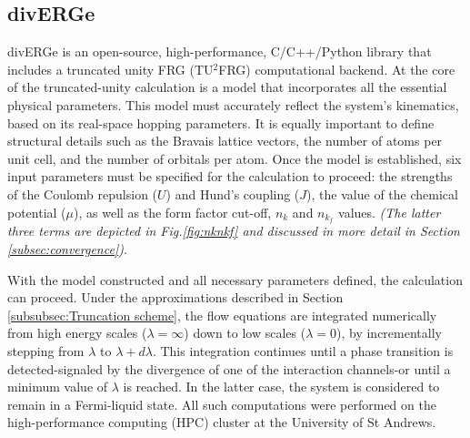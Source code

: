 \documentclass[12pt]{article}
\begin{document}
\subsection{divERGe}
\label{subsec:diverge}




\noindent divERGe is an open-source, high-performance, C/C++/Python library that includes a truncated unity FRG (TU$^2$FRG) computational backend\cite{profe2024diverge}. 
At the core of the truncated-unity calculation is a model that incorporates all the essential physical parameters. This model must accurately reflect the system's kinematics, based on its real-space hopping parameters.
It is equally important to define structural details such as the Bravais lattice vectors, the number of atoms per unit cell, 
and the number of orbitals per atom. Once the model is established, six input parameters must be specified for the calculation to proceed: 
the strengths of the Coulomb repulsion ($U$) and Hund’s coupling ($J$), the value of the chemical potential ($\mu$), as well as the form factor cut-off, $n_k$ and $n_{k_f}$
values. \textit{(The latter three terms are depicted in Fig.\ref{fig:nknkf} and discussed in more detail in Section \ref{subsec:convergence})}.\par
\medskip
\noindent With the model constructed and all necessary parameters defined, 
the calculation can proceed. Under the approximations described in Section \ref{subsubsec:Truncation scheme},
the flow equations are integrated numerically from high energy scales ($\lambda = \infty$) down to low scales ($\lambda = 0$), 
by incrementally stepping from $\lambda$ to $\lambda + d\lambda$. This integration continues until a phase transition is detected-signaled 
by the divergence of one of the interaction channels-or until a minimum value of $\lambda$ is reached. In the latter case, the system is considered to remain 
in a Fermi-liquid state. All such computations were performed on the high-performance computing (HPC) cluster at the University of St Andrews.
\end{document}
